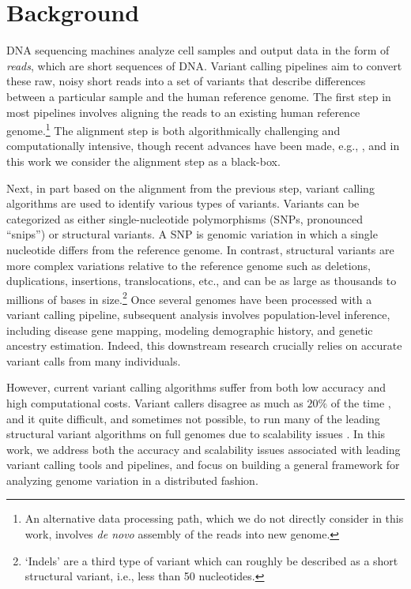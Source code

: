 \documentclass[12pt]{article}
\begin{document}
\section{Background}
DNA sequencing machines analyze cell samples and output data in the form of
\emph{reads}, which are short sequences of DNA.  Variant calling pipelines aim
to convert these raw, noisy short reads into a set of variants that describe
differences between a particular sample and the human reference genome. The
first step in most pipelines involves aligning the reads to an existing human
reference genome.\footnote{An alternative data processing path, which we do not
directly consider in this work, involves \emph{de novo} assembly of the reads
into new genome.} The alignment step is both algorithmically challenging and
computationally intensive, though recent advances have been made, e.g.,
\cite{snap}, and in this work we consider the alignment step as a black-box.

Next, in part based on the alignment from the previous step, variant calling
algorithms are used to identify various types of variants.  Variants can be
categorized as either single-nucleotide polymorphisms (SNPs, pronounced
``snips'') or structural variants.  A SNP is genomic variation in which a
single nucleotide differs from the reference genome.  In contrast, structural
variants are more complex variations relative to the reference genome such as
deletions, duplications, insertions, translocations, etc., and can be as large
as thousands to millions of bases in size.\footnote{`Indels' are a third type
of variant which can roughly be described as a short structural variant, i.e.,
less than 50 nucleotides.} 
Once several genomes have been processed with a variant calling pipeline,
subsequent analysis involves population-level inference, including disease gene
mapping, modeling demographic history, and genetic ancestry estimation. Indeed,
this downstream research crucially relies on accurate variant calls from many
individuals.  

However, current variant calling algorithms suffer from both low accuracy and
high computational costs. Variant callers disagree as much as $20\%$ of the
time \cite{haussler}, and it quite difficult, and sometimes not possible, to
run many of the leading structural variant algorithms on full genomes due to
scalability issues \cite{kristalcurtis}.  In this work, we address both the
accuracy and scalability issues associated with leading variant calling tools
and pipelines, and focus on building a general framework for analyzing genome
variation in a distributed fashion.  
\end{document}
